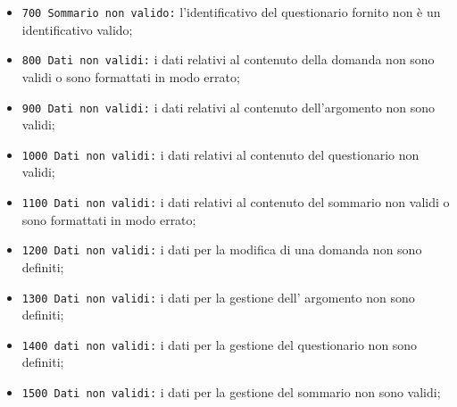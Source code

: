 \begin{itemize}
	\item \texttt{700 Sommario non valido:} l'identificativo del questionario fornito non è un identificativo valido;
	\item \texttt{800 Dati non validi:} i dati relativi al contenuto della domanda non sono  validi o sono formattati in modo errato;
	\item \texttt{900 Dati non validi:} i dati relativi al contenuto dell'argomento non sono validi;
	\item \texttt{1000 Dati non validi:} i dati relativi al contenuto del questionario non validi;
	\item \texttt{1100 Dati non validi:} i dati relativi al contenuto del  sommario non validi o sono formattati in modo errato;
	\item \texttt{1200 Dati non validi:} i dati per la modifica di una domanda non sono definiti;
	\item \texttt{1300 Dati non validi:} i dati per la gestione dell' argomento non sono definiti;
	\item \texttt{1400 dati non validi:} i dati per la gestione del questionario non sono definiti;
	\item \texttt{1500 Dati non validi:} i dati per la gestione del sommario non sono validi;
\end{itemize}

